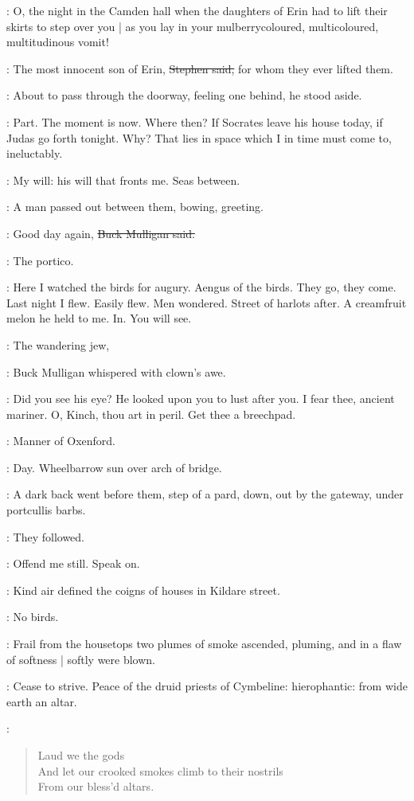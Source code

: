 \mulligan:
O,
the night in the Camden hall when the daughters of Erin had to lift their skirts to step over you |
as you lay in your mulberrycoloured, multicoloured, multitudinous vomit!

\Stephen:
The most innocent son of Erin,
\sout{Stephen said,}
for whom they ever lifted them.

:
About to pass through the doorway,
feeling one behind,
he stood aside.

\StephenInt:
Part.
The moment is now.
Where then?
If Socrates leave his house today,
if Judas go forth tonight.
Why?
That lies in space which I in time must come to,
ineluctably.

\StephenInt:
My will:
his will that fronts me.
Seas between.

:
A man passed out between them,
bowing,
greeting.

\mulligan:
Good day again,
\sout{Buck Mulligan said.}

\StephenInt:
The portico.

\StephenInt:
Here I watched the birds for augury.
Aengus of the birds.
They go,
they come.
Last night I flew.
Easily flew.
Men wondered.
Street of harlots after.
A creamfruit melon he held to me.
In.
You will see.

\mulligan:
The wandering jew,

:
Buck Mulligan whispered with clown's awe.

\mulligan:
Did you see his eye?
He looked upon you to lust after you.
I fear thee,
ancient mariner.
O, Kinch,
thou art in peril.
Get thee a breechpad.

\StephenInt:
Manner of Oxenford.

\StephenInt:
Day.
Wheelbarrow sun over arch of bridge.

:
A dark back went before them,
step of a pard,
down,
out by the gateway,
under portcullis barbs.

:
They followed.

\StephenInt:
Offend me still.
Speak on.

:
Kind air defined the coigns of houses in Kildare street.

\StephenInt:
No birds.

:
Frail from the housetops two plumes of smoke ascended,
pluming,
and in a flaw of softness |
softly were blown.

\StephenInt:
Cease to strive.
Peace of the druid priests of Cymbeline:
hierophantic:
from wide earth an altar.

\StephenInt:
\begin{verse}
    Laud we the gods \\
    And let our crooked smokes climb to their nostrils \\
    From our bless'd altars.
\end{verse}
